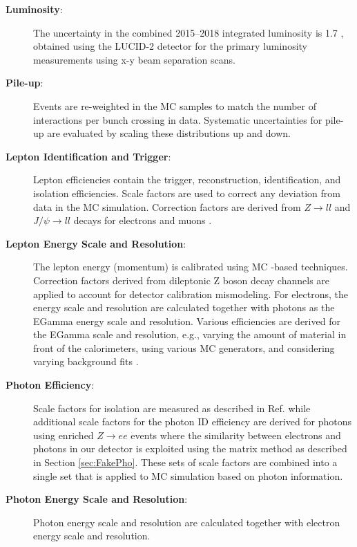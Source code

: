 \begin{description}
\item[\textbf{Luminosity}:] The uncertainty in the combined 2015--2018 integrated luminosity is 1.7  \cite{ATLAS-CONF-2019-021}, obtained using the LUCID-2 detector \cite{LUCID2} for the primary luminosity measurements using x-y beam separation scans.

\item[\textbf{Pile-up}:]  Events are re-weighted in the MC samples to match the number of interactions per bunch crossing in data.  Systematic uncertainties for pile-up are evaluated by scaling these distributions up and down.

\item[\textbf{Lepton Identification and Trigger}:]   Lepton efficiencies contain the trigger, reconstruction, identification, and isolation efficiencies.  Scale factors are used to correct any deviation from data in the MC simulation.  Correction factors are derived from $Z\rightarrow ll$ and $J/ \psi \rightarrow ll$ decays for electrons \cite{ElectronID} and muons \cite{MuonID}.

\item[\textbf{Lepton Energy Scale and Resolution}:]  The lepton energy (momentum) is calibrated using MC -based techniques.  Correction factors derived from dileptonic Z boson decay channels are applied to account for detector calibration mismodeling.  For electrons, the energy scale and resolution are calculated together with photons as the EGamma energy scale and resolution.  Various efficiencies are derived for the EGamma scale and resolution, e.g., varying the amount of material in front of the calorimeters, using various MC generators, and considering varying background fits \cite{ElectronID, PhotonID}.
\item[\textbf{Photon Efficiency}:]  Scale factors for isolation are measured as described in Ref. \cite{Lesage:2017uzg} while additional scale factors for the photon ID efficiency are derived for photons using enriched $Z\rightarrow ee$ events where the similarity between electrons and photons in our detector is exploited using the matrix method as described in Section \ref{sec:FakePho}. These sets of scale factors are combined into a single set that is applied to MC simulation based on photon information.

\item[\textbf{Photon Energy Scale and Resolution}:]  Photon energy scale and resolution are calculated together with electron energy scale and resolution.


\end{description}

